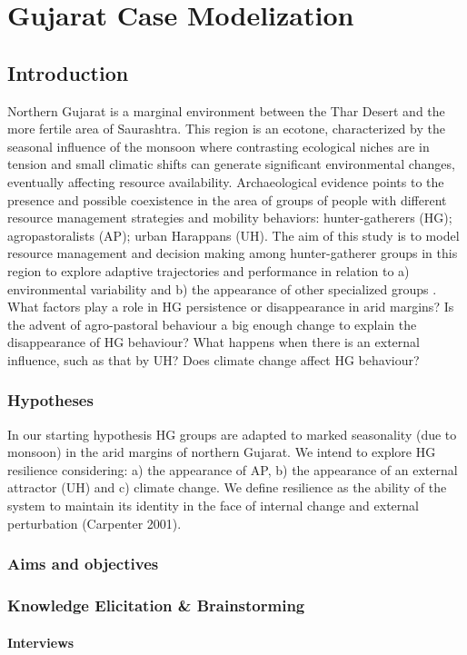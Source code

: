 \documentclass{report}
\begin{document}
\chapter{Gujarat Case Modelization}
	\section{Introduction}
Northern Gujarat is a marginal environment between the Thar Desert and the more fertile area of Saurashtra. This region is an ecotone, characterized by the seasonal influence of the monsoon where contrasting ecological niches are in tension and small climatic shifts can generate significant environmental changes, eventually affecting  resource availability. Archaeological evidence points to the presence and possible coexistence in the area of groups of people with different resource management strategies and mobility behaviors: hunter-gatherers (HG); agropastoralists (AP); urban Harappans (UH).
The aim of this study is to model resource management and decision making among hunter-gatherer groups in this region to explore adaptive trajectories and performance in relation to a) environmental variability and b) the appearance of other specialized groups . 
What factors play a role in HG persistence or disappearance in arid margins? Is the advent of agro-pastoral behaviour a big enough change to explain the disappearance of HG behaviour? What happens when there is an external influence, such as that by UH? Does climate change affect HG behaviour?
	    \subsection{Hypotheses}
In our starting hypothesis HG groups are adapted to marked seasonality (due to monsoon) in the arid margins of northern Gujarat. We intend to explore HG resilience considering: a) the appearance of AP, b) the appearance of an external attractor (UH) and c) climate change. We define resilience as the ability of the system to maintain its identity in the face of internal change and external perturbation (Carpenter 2001).
	    \subsection{Aims and objectives}
	    \subsection{Knowledge Elicitation \& Brainstorming}
		\subsubsection{Interviews}
\end{document}
